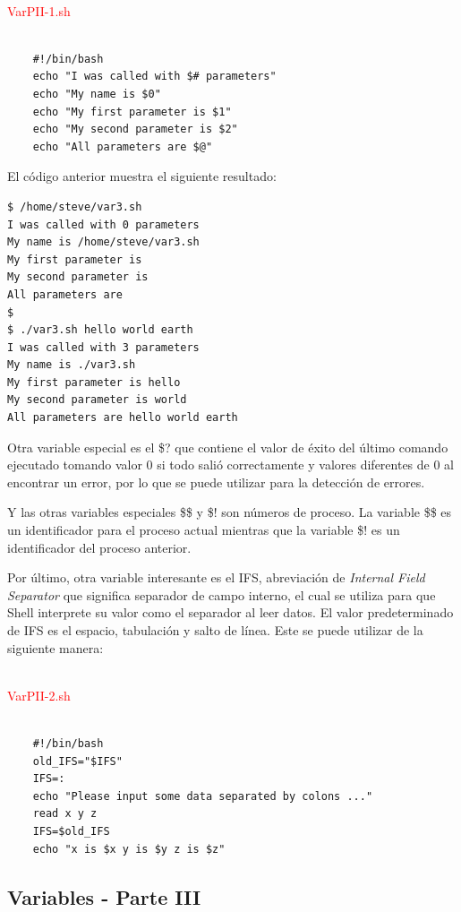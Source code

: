 \documentclass{article}
\begin{document}
~\\
\textcolor{red}{VarPII-1.sh}
\begin{framed}
\begin{verbatim}
	
    #!/bin/bash
    echo "I was called with $# parameters"
    echo "My name is $0"
    echo "My first parameter is $1"
    echo "My second parameter is $2"
    echo "All parameters are $@"
\end{verbatim}
\end{framed}

El código anterior muestra el siguiente resultado:
\begin{verbatim}
$ /home/steve/var3.sh
I was called with 0 parameters
My name is /home/steve/var3.sh
My first parameter is
My second parameter is    
All parameters are 
$
$ ./var3.sh hello world earth
I was called with 3 parameters
My name is ./var3.sh
My first parameter is hello
My second parameter is world
All parameters are hello world earth
\end{verbatim}

Otra variable especial es el \$? que contiene el valor de éxito del último comando ejecutado tomando valor 0 si todo salió correctamente y valores diferentes de 0 al encontrar un error, por lo que se puede utilizar para la detección de errores.

Y las otras variables especiales \$\$ y \$! son números de proceso. La variable \$\$ es un identificador para el proceso actual mientras que la variable \$! es un identificador del proceso anterior.

Por último, otra variable interesante es el IFS, abreviación de \textit{Internal Field Separator} que significa separador de campo interno, el cual se utiliza para que Shell interprete su valor como el separador al leer datos. El valor predeterminado de IFS es el espacio, tabulación y salto de línea. Este se puede utilizar de la siguiente manera:

~\\
\textcolor{red}{VarPII-2.sh}
\begin{framed}
\begin{verbatim}
	
    #!/bin/bash
    old_IFS="$IFS"
    IFS=:
    echo "Please input some data separated by colons ..."
    read x y z
    IFS=$old_IFS
    echo "x is $x y is $y z is $z"
\end{verbatim}
\end{framed}

\subsection{Variables - Parte III}
\end{document}
